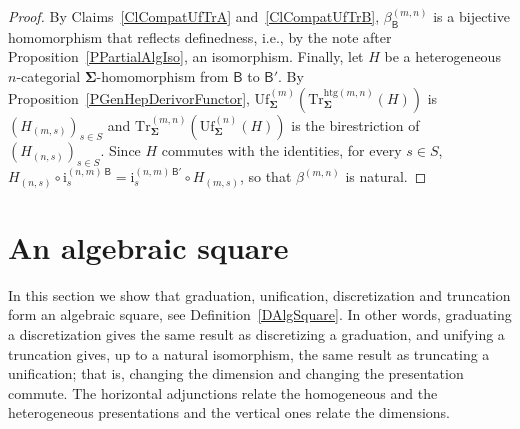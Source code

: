\documentclass[a4paper, reqno]{amsbook}
\newcommand{\sig}[1]{\mathbf{#1}}             %
\newcommand{\calg}[1]{\boldsymbol{\mathsf{#1}}} %
\newcommand{\htg}{\mathrm{htg}}                %
\newcommand{\Uf}{\mathrm{Uf}}
\newcommand{\Tr}{\mathrm{Tr}}
\theoremstyle{plain}
\theoremstyle{definition}
\begin{document}
\begin{proof}
By Claims~\ref{ClCompatUfTrA} and~\ref{ClCompatUfTrB}, $\beta^{(m,n)}_{\calg{B}}$ is a bijective homomorphism that reflects definedness, i.e., by the note after Proposition~\ref{PPartialAlgIso}, an isomorphism.
Finally, let $H$ be a heterogeneous $n$-categorial $\sig{\Sigma}$-homomorphism from $\calg{B}$ to $\calg{B}'$.
By Proposition~\ref{PGenHepDerivorFunctor}, $\Uf^{(m)}_{\sig{\Sigma}}(\Tr^{\htg(m,n)}_{\sig{\Sigma}}(H))$ is $(H_{(m,s)})_{s\in S}$ and $\Tr^{(m,n)}_{\sig{\Sigma}}(\Uf^{(n)}_{\sig{\Sigma}}(H))$ is the birestriction of $(H_{(n,s)})_{s\in S}$.
Since $H$ commutes with the identities, for every $s\in S$, $H_{(n,s)}\circ\mathrm{i}^{(n,m)\,\calg{B}}_{s}=\mathrm{i}^{(n,m)\,\calg{B}'}_{s}\circ H_{(m,s)}$, so that $\beta^{(m,n)}$ is natural.
\end{proof}

\section{An algebraic square}\label{SAlgSquare}

In this section we show that graduation, unification, discretization and truncation form an algebraic square, see Definition~\ref{DAlgSquare}.
In other words, graduating a discretization gives the same result as discretizing a graduation, and unifying a truncation gives, up to a natural isomorphism, the same result as truncating a unification; that is, changing the dimension and changing the presentation commute.
The horizontal adjunctions relate the homogeneous and the heterogeneous presentations and the vertical ones relate the dimensions.
\end{document}
